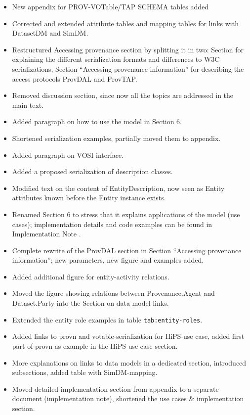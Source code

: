 \begin{itemize}
\item New appendix for PROV-VOTable/TAP SCHEMA tables added
\item Corrected and extended attribute tables and mapping tables for links with DatasetDM and SimDM.
\item Restructured Accessing provenance section by splitting it in two: Section for explaining the different serialization formats and differences to W3C serializations, Section ``Accessing provenance information''%
for describing the access protocols ProvDAL and ProvTAP.
\item Removed discussion section, since now all the topics are addressed in the main text.
\item Added paragraph on how to use the model in Section 6. %
\item Shortened serialization examples, partially moved them to appendix.
\item Added paragraph on VOSI interface.
\item Added a proposed serialization of description classes.
\item Modified text on the content of EntityDescription, now seen as Entity attributes known before the Entity instance exists.
\item Renamed Section 6
to stress that it explains applications of the model (use cases); implementation details and code examples can be found in Implementation Note \citep{std:ProvenanceImplementationNote}.
\item Complete rewrite of the ProvDAL section in Section ``Accessing provenance information'';%
new parameters, new figure and examples added.
\item Added additional figure for entity-activity relations.
\item Moved the figure showing relations between Provenance.Agent and Dataset.Party into the Section on data model links.
\item Extended the entity role examples in table \texttt{tab:entity-roles}.
\item Added links to provn and votable-serialization for HiPS-use case, added first part of provn as example in the HiPS-use case section.
\item More explanations on links to data models in a dedicated section, introduced subsections, added table with SimDM-mapping.
\item Moved detailed implementation section from appendix to a separate document (implementation note), shortened the use cases \& implementation section.

\end{itemize}
